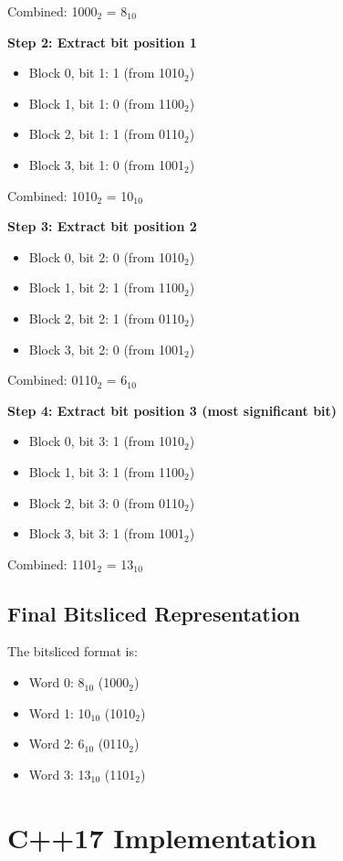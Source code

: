 \documentclass[12pt,a4paper]{article}
\begin{document}
Combined: 1000$_2$ = 8$_{10}$

\textbf{Step 2: Extract bit position 1}
\begin{itemize}
    \item Block 0, bit 1: 1 (from 1010$_2$)
    \item Block 1, bit 1: 0 (from 1100$_2$)
    \item Block 2, bit 1: 1 (from 0110$_2$)
    \item Block 3, bit 1: 0 (from 1001$_2$)
\end{itemize}

Combined: 1010$_2$ = 10$_{10}$

\textbf{Step 3: Extract bit position 2}
\begin{itemize}
    \item Block 0, bit 2: 0 (from 1010$_2$)
    \item Block 1, bit 2: 1 (from 1100$_2$)
    \item Block 2, bit 2: 1 (from 0110$_2$)
    \item Block 3, bit 2: 0 (from 1001$_2$)
\end{itemize}

Combined: 0110$_2$ = 6$_{10}$

\textbf{Step 4: Extract bit position 3 (most significant bit)}
\begin{itemize}
    \item Block 0, bit 3: 1 (from 1010$_2$)
    \item Block 1, bit 3: 1 (from 1100$_2$)
    \item Block 2, bit 3: 0 (from 0110$_2$)
    \item Block 3, bit 3: 1 (from 1001$_2$)
\end{itemize}

Combined: 1101$_2$ = 13$_{10}$

\subsection{Final Bitsliced Representation}
The bitsliced format is:
\begin{itemize}
    \item Word 0: 8$_{10}$ (1000$_2$)
    \item Word 1: 10$_{10}$ (1010$_2$)
    \item Word 2: 6$_{10}$ (0110$_2$)
    \item Word 3: 13$_{10}$ (1101$_2$)
\end{itemize}

\section{C++17 Implementation}
\end{document}
